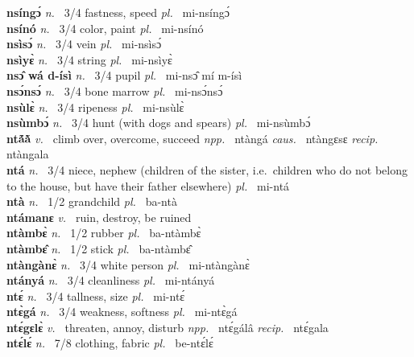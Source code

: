 {\bfseries nsíngɔ́}  {\itshape n.~} 3/4 fastness, speed {\itshape pl.~} mi-nsíngɔ́    \\ 
{\bfseries nsínó}  {\itshape n.~} 3/4 color, paint {\itshape pl.~} mi-nsínó    \\ 
{\bfseries nsìsɔ́}  {\itshape n.~} 3/4 vein {\itshape pl.~} mi-nsìsɔ́    \\ 
{\bfseries nsìyɛ̀}  {\itshape n.~} 3/4 string {\itshape pl.~} mi-nsìyɛ̀    \\ 
{\bfseries nsɔ̂ wá d-ísì}  {\itshape n.~} 3/4 pupil {\itshape pl.~} mi-nsɔ̂ mí m-ísì    \\ 
{\bfseries nsɔ́nsɔ́}  {\itshape n.~} 3/4 bone marrow {\itshape pl.~} mi-nsɔ́nsɔ́    \\ 
{\bfseries nsùlɛ̀}  {\itshape n.~} 3/4 ripeness {\itshape pl.~} mi-nsùlɛ̀    \\ 
{\bfseries nsùmbɔ́}  {\itshape n.~} 3/4 hunt (with dogs and spears) {\itshape pl.~} mi-nsùmbɔ́    \\ 
{\bfseries ntã́ã̀}  {\itshape v.~} climb over, overcome, succeed   {\itshape npp.~} ntàngá {\itshape caus.~} ntàngɛsɛ {\itshape recip.~} ntàngala  \\ 
{\bfseries ntá}  {\itshape n.~} 3/4 niece, nephew (children of the sister, i.e.\ children who do not belong to the house, but have their father elsewhere) {\itshape pl.~} mi-ntá    \\ 
{\bfseries ntà}  {\itshape n.~} 1/2 grandchild {\itshape pl.~} ba-ntà    \\ 
{\bfseries ntámanɛ}  {\itshape v.~} ruin, destroy, be ruined    \\ 
{\bfseries ntàmbɛ̀}  {\itshape n.~} 1/2 rubber {\itshape pl.~} ba-ntàmbɛ̀    \\ 
{\bfseries ntàmbɛ̂}  {\itshape n.~} 1/2 stick {\itshape pl.~} ba-ntàmbɛ̂    \\ 
{\bfseries ntàngànɛ̀}  {\itshape n.~} 3/4 white person {\itshape pl.~} mi-ntàngànɛ̀    \\ 
{\bfseries ntányá}  {\itshape n.~} 3/4 cleanliness {\itshape pl.~} mi-ntányá    \\ 
{\bfseries ntɛ́}  {\itshape n.~} 3/4 tallness, size {\itshape pl.~} mi-ntɛ́    \\ 
{\bfseries ntɛ̀gá}  {\itshape n.~} 3/4 weakness, softness {\itshape pl.~} mi-ntɛ̀gá   \\ 
{\bfseries ntɛ́gɛlɛ̀}  {\itshape v.~} threaten, annoy, disturb   {\itshape npp.~} ntɛ́gálâ {\itshape recip.~} ntɛ́gala  \\ 
{\bfseries ntɛ́lɛ́}  {\itshape n.~} 7/8 clothing, fabric {\itshape pl.~} be-ntɛ́lɛ́    \\ 
